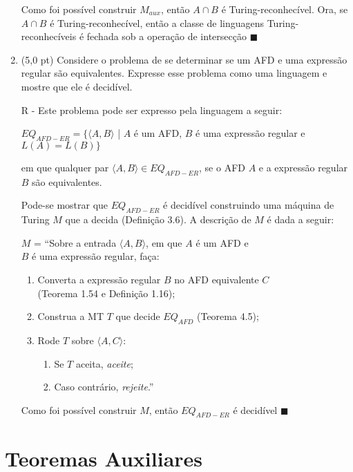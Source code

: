 \documentclass[12pt,a4paper,oneside]{article}
\begin{document}
\begin{enumerate}
{			Como foi possível construir $M_{aux}$, então $A \cap B$ é Turing-reconhecível. Ora, se $A \cap B$ é Tu\-ring-reconhecível, então a classe de linguagens Tu\-ring-reconhecíveis é fechada sob a operação de intersecção $\blacksquare$
			}
	
	\newpage	
	
	\item (5,0 pt) Considere o problema de se determinar se um AFD e uma expressão regular são equivalentes. Expresse esse problema como uma linguagem e mostre que ele é decidível.
	
	\vspace{0.3cm}	
	
	{ \color{verde}
	R - Este problema pode ser expresso pela linguagem a seguir:
		\begin{center}
			$EQ_{AFD-ER} = \{ \langle A, B\rangle$ | $A$ é um AFD, $B$ é uma expressão regular e $L(A) = L(B) \}$
		\end{center}
		em que qualquer par $\langle A, B\rangle \in EQ_{AFD-ER}$, se o AFD $A$ e a expressão regular $B$ são equivalentes.
		
		Pode-se mostrar que $EQ_{AFD-ER}$ é decidível construindo uma máquina de Turing $M$ que a decida (Definição 3.6). A descrição de $M$ é dada a seguir:
			
			$M$ = ``Sobre a entrada $\langle A, B\rangle$, em que $A$ é um AFD e \\ 
			$B$ é uma expressão regular, faça:
			\begin{enumerate}
				\item Converta a expressão regular $B$ no AFD equivalente $C$ \\(Teorema 1.54 e Definição 1.16); 
				\item Construa a MT $T$ que decide $EQ_{AFD}$ (Teorema 4.5); 
				\item  Rode $T$ sobre $\langle A, C\rangle$:
					\begin{enumerate}
						\item Se $T$ aceita, {\it aceite};
						\item Caso contrário, {\it rejeite}.''
					\end{enumerate}
			\end{enumerate}
			
			Como foi possível construir $M$, então $EQ_{AFD-ER}$ é decidível $\blacksquare$
	}
	
\end{enumerate}

\section*{Teoremas Auxiliares}
\end{document}
